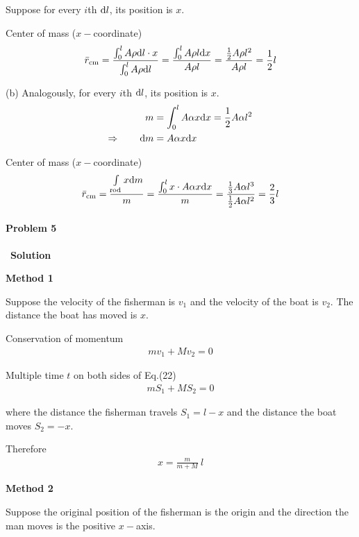 \documentclass[12pt,a4paper]{article}
\begin{document}
Suppose for every $i$th ${\rm d}l$, its position is $x$.

Center of mass ($x-$coordinate)
\begin{align}
    \bar{r}_{\rm cm} = \frac{\int_0^l A\rho{\rm d}l\cdot x}{\int_0^l A\rho{\rm d}l} 
    = \frac{\int_0^l A\rho l {\rm d}x}{A\rho l} = \frac{\frac{1}{2}A\rho l^2}{A\rho l}
    = \frac{1}{2}l
\end{align}

(b) Analogously, for every $i$th ${\rm d}l$, its position is $x$.
\begin{align}
    m &=  \int_0^l A\alpha x {\rm d}x = \frac{1}{2}A\alpha l^2\\
\Rightarrow\qquad {\rm d}m &= A\alpha x{\rm d}x
\end{align}


Center of mass ($x-$coordinate)
\begin{align}
    \bar{r}_{\rm cm} = \frac{\int\limits_{\rm rod} x {\rm d}m}{m} = \frac{\int_0^l x \cdot 
    A\alpha x{\rm d}x}{m}
    = \frac{\frac{1}{3}A\alpha l^3}{\frac{1}{2}A\alpha l^2} = \frac{2}{3}l
\end{align}

\paragraph{\large \textbf{Problem 5}}~{\textbf{Solution}}
\vspace{2mm}

\noindent \textbf{Method 1}

Suppose the velocity of the fisherman is $v_1$ and the velocity of the boat is $v_2$.
The distance the boat has moved is $x$.

Conservation of momentum
\begin{align}
    mv_1 + Mv_2 = 0
\end{align}

Multiple time $t$ on both sides of Eq.(22)
\begin{align}
    mS_1 + MS_2 = 0
\end{align}

where the distance the fisherman travels $S_1=l-x$ and the distance the boat moves $S_2=-x$.

Therefore
\begin{align}
    x = \frac{m}{m+M}\ l
\end{align}

\noindent \textbf{Method 2}

Suppose the original position of the fisherman is the origin and the direction the man moves
is the positive $x-$axis.
\end{document}

